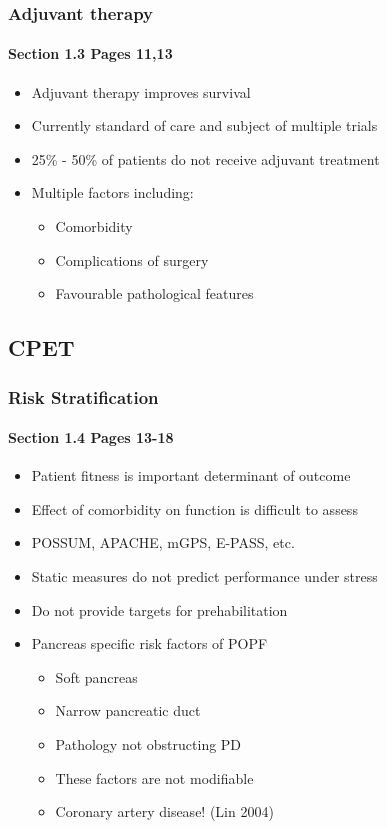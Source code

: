 \documentclass{beamer}
\begin{document}
\begin{frame}
	\frametitle{Adjuvant therapy}
	\framesubtitle{Section 1.3 Pages 11,13 }
	\begin{itemize}
		\item Adjuvant therapy improves survival
		\item Currently standard of care and subject of multiple trials
		\item 25\% - 50\% of patients do not receive adjuvant treatment
		\item Multiple factors including:
		\begin{itemize}
			\item Comorbidity
			\item Complications of surgery
			\item Favourable pathological features
		\end{itemize}
	\end{itemize}
\end{frame}

\subsection{CPET}
\begin{frame}
	\frametitle{Risk Stratification }
	\framesubtitle{Section 1.4 Pages 13-18 }
	\begin{itemize}
		\item Patient fitness is important determinant of outcome
		\item Effect of comorbidity on function is difficult to assess
		\item POSSUM, APACHE, mGPS, E-PASS, etc.
		\item Static measures do not predict performance under stress
		\item Do not provide targets for prehabilitation
		\item Pancreas specific risk factors of POPF
		\begin{itemize}
			\item Soft pancreas
			\item Narrow pancreatic duct
			\item Pathology not obstructing PD
			\item These factors are not modifiable
			\item Coronary artery disease! (Lin 2004)
		\end{itemize}
	\end{itemize}
\end{frame}
\end{document}
